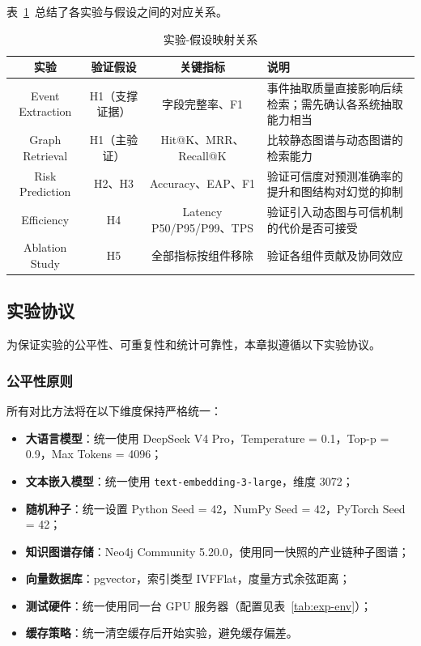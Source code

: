 \documentclass[12pt,a4paper]{article}
\newcommand{\term}[1]{\textbf{#1}}
\begin{document}
表~\ref{tab:hypothesis-mapping}~总结了各实验与假设之间的对应关系。

\begin{table}[H]
\centering
\footnotesize
\caption{实验-假设映射关系}
\label{tab:hypothesis-mapping}
\begin{tabularx}{0.95\linewidth}{c c c X}
\toprule
\textbf{实验} & \textbf{验证假设} & \textbf{关键指标} & \textbf{说明} \\
\midrule
Event Extraction & H1（支撑证据） & 字段完整率、F1 & 事件抽取质量直接影响后续检索；需先确认各系统抽取能力相当 \\
Graph Retrieval & H1（主验证） & Hit@K、MRR、Recall@K & 比较静态图谱与动态图谱的检索能力 \\
Risk Prediction & H2、H3 & Accuracy、EAP、F1 & 验证可信度对预测准确率的提升和图结构对幻觉的抑制 \\
Efficiency & H4 & Latency P50/P95/P99、TPS & 验证引入动态图与可信机制的代价是否可接受 \\
Ablation Study & H5 & 全部指标按组件移除 & 验证各组件贡献及协同效应 \\
\bottomrule
\end{tabularx}
\end{table}

\subsection{实验协议}
\label{sec:exp-protocol}

为保证实验的公平性、可重复性和统计可靠性，本章拟遵循以下实验协议。

\subsubsection{公平性原则}

所有对比方法将在以下维度保持严格统一：
\begin{itemize}
    \item \term{大语言模型}：统一使用 DeepSeek V4 Pro，Temperature = 0.1，Top-p = 0.9，Max Tokens = 4096；
    \item \term{文本嵌入模型}：统一使用 \texttt{text-embedding-3-large}，维度 3072；
    \item \term{随机种子}：统一设置 Python Seed = 42，NumPy Seed = 42，PyTorch Seed = 42；
    \item \term{知识图谱存储}：Neo4j Community 5.20.0，使用同一快照的产业链种子图谱；
    \item \term{向量数据库}：pgvector，索引类型 IVFFlat，度量方式余弦距离；
    \item \term{测试硬件}：统一使用同一台 GPU 服务器（配置见表~\ref{tab:exp-env}）；
    \item \term{缓存策略}：统一清空缓存后开始实验，避免缓存偏差。
\end{itemize}
\end{document}
